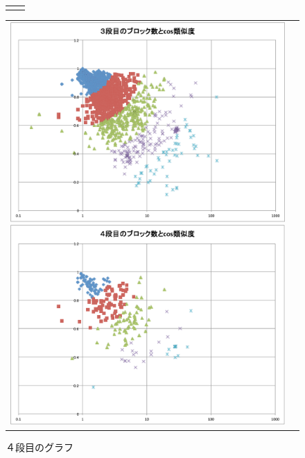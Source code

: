 \documentclass[twocolumn,9pt,a4paper]{jsarticle}
\begin{document}
\begin{figure}[h]
\begin{tabular}{cc}
\begin{minipage}[t]{0.45\hsize}
	\end{minipage}
 \end{tabular}
  \begin{tabular}{cc}
 	\begin{minipage}[t]{0.45\hsize}
	 \centering
	 \includegraphics[keepaspectratio, scale = 0.15]{graph_3_block.pdf}
	 \caption{３段目のグラフ}
	 \label{third_block}
	\end{minipage}
        \begin{minipage}[t]{0.45\hsize}
	 \centering
	 \includegraphics[keepaspectratio, scale = 0.15]{graph_4_block.pdf}
	 \caption{４段目のグラフ}
	 \label{fourth_block}
	\end{minipage}
 \end{tabular}
 \end{figure}
\end{document}
